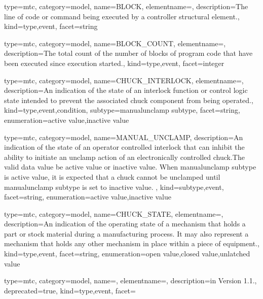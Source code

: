 {
  type=mtc,
  category=model,
  name={BLOCK},
  elementname=,
  description={The line of code or command being executed by a \gls{controller} \gls{structural element}.},
  kind={type,event},
  facet={\gls{string}}
}


{
  type=mtc,
  category=model,
  name={BLOCK\_COUNT},
  elementname=,
  description={The total count of the number of blocks of program code that have been executed since execution started.},
  kind={type,event},
  facet={\gls{integer}}
}


{
  type=mtc,
  category=model,
  name={CHUCK\_INTERLOCK},
  elementname=,
  description={An indication of the state of an interlock function or control logic state intended to prevent the associated \gls{chuck} component from being operated.},
  kind={type,event,condition},
  subtype={\gls{manualunclamp subtype}},
  facet={\gls{string}},
  enumeration={\gls{active value},\gls{inactive value}}
}


{
  type=mtc,
  category=model,
  name={MANUAL\_UNCLAMP},
  description={An indication of the state of an operator controlled interlock that can inhibit the ability to initiate an unclamp action of an electronically controlled chuck.\newline The \gls{valid data value} \must be \gls{active value} or \gls{inactive value}. \newline When \gls{manualunclamp subtype} is \gls{active value}, it is expected that a chuck cannot be unclamped until \gls{manualunclamp subtype} is set to \gls{inactive value}. },
  kind={subtype,event},
  facet={\gls{string}},
  enumeration={\gls{active value},\gls{inactive value}}
}


{
  type=mtc,
  category=model,
  name={CHUCK\_STATE},
  elementname=,
  description={An indication of the operating state of a mechanism that holds a part or stock material during a manufacturing process. It may also represent a mechanism that holds any other mechanism in place within a piece of equipment.},
  kind={type,event},
  facet={\gls{string}},
  enumeration={\gls{open value},\gls{closed value},\gls{unlatched value}}
}


{
  type=mtc,
  category=model,
  name=,
  elementname=,
  description={\DEPRECATED in Version 1.1.},
  deprecated={true},
  kind={type,event},
  facet={}
}


